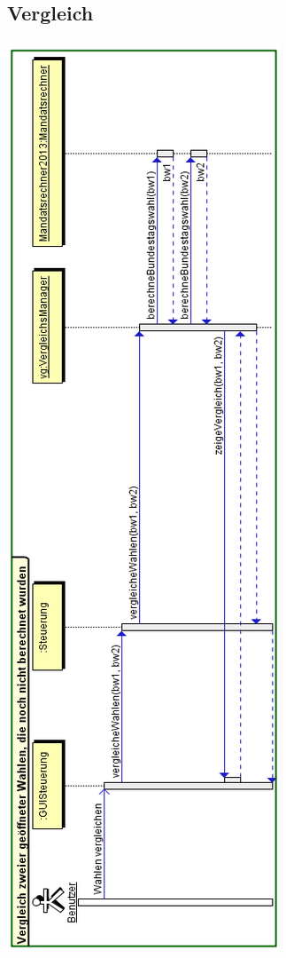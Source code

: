 \documentclass[10pt,a4paper]{article}
\begin{document}
\subsection{Vergleich}
\includegraphics[scale=0.75]{Vergleich-Sequenzdiagramm.png} 
\end{document}

